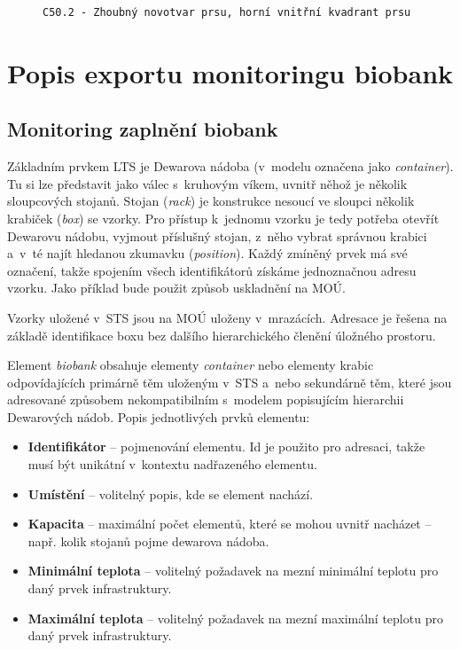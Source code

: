 \documentclass[11pt, draft, oneside]{fithesis2}
\newcommand{\polozka}[1]{\item {\bf #1}\xspace}
\begin{document}
\begin{figure}[h!]
\centering
\begin{BVerbatim}
C50.2 - Zhoubný novotvar prsu, horní vnitřní kvadrant prsu
\end{BVerbatim}
\end{figure}

\section{Popis exportu monitoringu biobank}

\subsection{Monitoring zaplnění biobank}\label{chapter:analysis:subsection:monitoring}
Základním prvkem LTS je Dewarova nádoba (v~modelu označena jako \textit{container}). Tu si lze představit jako válec s~kruhovým víkem, uvnitř něhož je několik sloupcových stojanů. Stojan (\textit{rack}) je konstrukce nesoucí ve sloupci několik krabiček (\textit{box}) se vzorky. Pro přístup k~jednomu vzorku je tedy potřeba otevřít Dewarovu nádobu, vyjmout příslušný stojan, z~něho vybrat správnou krabici a~v~té najít hledanou zkumavku (\textit{position}). Každý zmíněný prvek má své označení, takže spojením všech identifikátorů získáme jednoznačnou adresu vzorku. Jako příklad bude použit způsob uskladnění na MOÚ.

Vzorky uložené v~STS jsou na MOÚ uloženy v~mrazácích. Adresace je řešena na základě identifikace boxu bez dalšího hierarchického členění úložného prostoru.

Element \textit{biobank} obsahuje elementy \textit{container} nebo elementy  krabic odpovídajících primárně těm uloženým v~STS a~nebo sekundárně těm, které jsou adresované způsobem nekompatibilním s~modelem popisujícím hierarchii Dewarových nádob. Popis jednotlivých prvků elementu:

\begin{itemize}

\polozka{{Identifikátor}} -- pojmenování elementu. Id je použito pro adresaci, takže musí být unikátní v~kontextu nadřazeného elementu.

\polozka{{Umístění}} -- volitelný popis, kde se element nachází.

\polozka{{Kapacita}} -- maximální počet elementů, které se mohou uvnitř nacházet -- např. kolik stojanů pojme dewarova nádoba.

\polozka{{Minimální teplota}} -- volitelný požadavek na mezní minimální teplotu pro daný prvek infrastruktury.

\polozka{{Maximální teplota}} -- volitelný požadavek na mezní maximální teplotu pro daný prvek infrastruktury.

\end{itemize}
\end{document}
